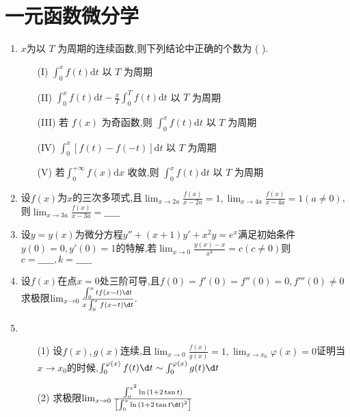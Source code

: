 \documentclass[12pt, a4paper, oneside, UTF8]{ctexbook}
\begin{document}
% 
\else
\fi

\chapter{一元函数微分学}
\begin{enumerate}
    \item $x$为以 $T$ 为周期的连续函数,则下列结论中正确的个数为 ( ).
    \begin{enumerate}
        \item [(I)] ${\int }_{0}^{x}f\left( t\right) \mathrm{d}t$ 以 $T$ 为周期
        \item [(II)] ${\int }_{0}^{x}f\left( t\right) \mathrm{d}t - \frac{x}{T}{\int }_{0}^{T}f\left( t\right) \mathrm{d}t$ 以 $T$ 为周期
        \item [(III)] 若 $f\left( x\right)$ 为奇函数,则 ${\int }_{0}^{x}f\left( t\right) \mathrm{d}t$ 以 $T$ 为周期
        \item [(IV)] ${\int }_{0}^{x}\left\lbrack  {f\left( t\right)  - f\left( {-t}\right) }\right\rbrack  \mathrm{d}t$ 以 $T$ 为周期
        \item [(V)] 若${\int }_{0}^{+\infty }f\left( x\right) \mathrm{d}x$ 收敛,则 ${\int }_{0}^{x}f\left( t\right) \mathrm{d}t$ 以 $T$ 为周期
    \end{enumerate}
    \begin{choices}
    \end{choices}
    
    
    \newpage
    

    \item 设$f(x)$为$x$的三次多项式,且$\lim_{x \to 2a}\frac{f(x)}{x-2a}=1,\lim_{x\to 4a}\frac{f(x)}{x-4a}=1(a\neq 0)$,则$\lim_{x\to 3a}\frac{f(x)}{x-3a}=\_\_\_\_\_$
    
    \newpage
    
    \item 设$y=y(x)$为微分方程$y''+(x+1)y'+x^2y=e^x$满足初始条件$y(0)=0,y'(0)=1$的特解,若$\lim_{x\to 0}\frac{y(x)-x}{x^k}=c(c\neq 0)$则$c=\_\_\_\_\_,k=\_\_\_\_\_$
    
    \newpage
    
    \item 设$f(x)$在点$x=0$处三阶可导,且$f(0)=f'(0)=f''(0)=0,f'''(0)\neq 0$求极限$\lim_{x\to 0}\frac{\int_{0}^{x}tf(x-t)\d t}{x\int_{0}^{x}f(x-t)\d t}.$
    
    \newpage
    
    \item 
    \begin{enumerate}
        \item[(1)] 设$f(x),g(x)$连续,且$\lim_{x\to 0}\frac{f(x)}{g(x)}=1,\lim_{x\to x_0}\varphi(x)=0$证明当$x\to x_0$的时候,$\int_{0}^{\varphi(x)}f(t)\d t \sim \int_{0}^{\varphi(x)}g(t)\d t$
        \item[(2)] 求极限$\lim_{x\to 0}\frac{\int_{0}^{x^2}\ln{(1+2\tan{t})}}{\left[\int_{0}^{x}\ln{(1+2\tan{t}\d t)}^2\right]}$
    \end{enumerate}
    

\end{enumerate}
\end{document}
